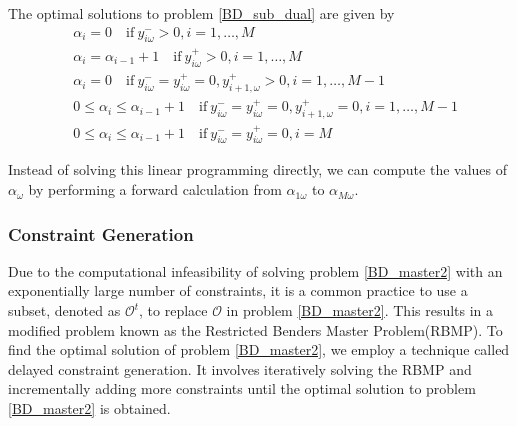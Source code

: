 \begin{prop}\label{optimal_sol_sub_dual}
  The optimal solutions to problem \eqref{BD_sub_dual} are given by 
\begin{equation}\label{BD_sub_simplified}
  \begin{aligned}
    & \alpha_{i} = 0 \quad \text{if}~  y_{i \omega}^{-} > 0,  i =1,\ldots, M \\
    & \alpha_{i} = \alpha_{i-1}+1 \quad \text{if}~ y_{i \omega}^{+} > 0, i =1,\ldots, M \\
    & \alpha_{i} = 0 \quad \text{if}~ y_{i \omega}^{-} = y_{i \omega}^{+} = 0, y_{i+1, \omega}^{+}> 0, i = 1,\ldots, M-1 \\
    & 0 \leq \alpha_{i} \leq \alpha_{i-1}+1 \quad \text{if}~ y_{i \omega}^{-} = y_{i \omega}^{+} = 0, y_{i+1, \omega}^{+}= 0, i = 1,\ldots, M-1 \\
    & 0 \leq \alpha_{i} \leq \alpha_{i-1}+1 \quad \text{if}~ y_{i \omega}^{-} = y_{i \omega}^{+} = 0, i = M
  \end{aligned}
\end{equation}
\end{prop}


Instead of solving this linear programming directly, we can compute the values of $\alpha_{\omega}$ by performing a forward calculation from $\alpha_{1\omega}$ to $\alpha_{M\omega}$.

\subsubsection{Constraint Generation}\label{bender_stage}

Due to the computational infeasibility of solving problem \eqref{BD_master2} with an exponentially large number of constraints, it is a common practice to use a subset, denoted as $\mathcal{O}^t$, to replace $\mathcal{O}$ in problem \eqref{BD_master2}. This results in a modified problem known as the Restricted Benders Master Problem(RBMP). To find the optimal solution of problem \eqref{BD_master2}, we employ a technique called delayed constraint generation. It involves iteratively solving the RBMP and incrementally adding more constraints until the optimal solution to problem \eqref{BD_master2} is obtained.


